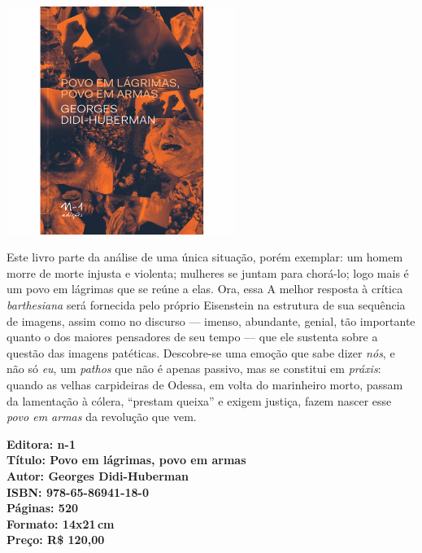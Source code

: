 \begin{center}
\hspace*{.5cm}\includegraphics[width=74mm]{./CAPAS/povo.jpg}
\end{center}

\hspace*{-7cm}\hrulefill\hspace*{-7cm}

\medskip

\noindent{}Este livro parte da análise de uma única situação, porém exemplar: um homem morre de morte injusta e violenta; mulheres se juntam para chorá-lo; logo mais é um povo em lágrimas que se reúne a elas. Ora, essa  
A melhor resposta à crítica \textit{barthesiana} será fornecida pelo próprio Eisenstein na estrutura de sua sequência de imagens, assim como no discurso --- imenso, abundante, genial, tão importante quanto o dos maiores pensadores de seu tempo --- que ele sustenta sobre a questão das imagens patéticas. Descobre-se uma emoção que sabe dizer \textit{nós}, e não só \textit{eu}, um \textit{pathos} que não é apenas passivo, mas se constitui em \textit{práxis}: quando as velhas carpideiras de Odessa, em volta do marinheiro morto, passam da lamentação à cólera, ``prestam queixa'' e exigem justiça, fazem nascer esse \textit{povo em armas} da revolução que vem.

\vfill

\hspace*{-.4cm}\begin{minipage}[c]{.5\linewidth}
\small\textbf{
\hspace*{-.1cm}Editora: n-1\\
Título: Povo em lágrimas, povo em armas\\
Autor: Georges Didi-Huberman\\ 
ISBN: 978-65-86941-18-0\\
Páginas: 520\\
Formato: 14x21\,cm\\
Preço: R\$ 120,00\\
}
\end{minipage}

